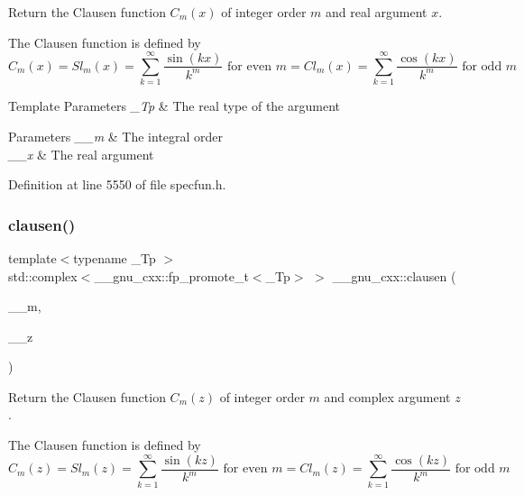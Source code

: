 Return the Clausen function $ C_m(x) $ of integer order $ m $ and real argument $ x $.

The Clausen function is defined by \[ C_m(x) = Sl_m(x) = \sum_{k=1}^\infty\frac{\sin(kx)}{k^m} \mbox{ for even } m = Cl_m(x) = \sum_{k=1}^\infty\frac{\cos(kx)}{k^m} \mbox{ for odd } m \]


\begin{DoxyTemplParams}{Template Parameters}
{\em \+\_\+\+Tp} & The real type of the argument \\
\hline
\end{DoxyTemplParams}

\begin{DoxyParams}{Parameters}
{\em \+\_\+\+\_\+m} & The integral order \\
\hline
{\em \+\_\+\+\_\+x} & The real argument \\
\hline
\end{DoxyParams}


Definition at line 5550 of file specfun.\+h.

\mbox{\label{group__gnu__math__spec__func_gaf7c4317ef6bfd3a4bf0ddcba22ee7588}} 
\subsubsection{\texorpdfstring{clausen()}{clausen()}\hspace{0.1cm}{\footnotesize\ttfamily [2/2]}}
{\footnotesize\ttfamily template$<$typename \+\_\+\+Tp $>$ \\
std\+::complex$<$\+\_\+\+\_\+gnu\+\_\+cxx\+::fp\+\_\+promote\+\_\+t$<$\+\_\+\+Tp$>$ $>$ \+\_\+\+\_\+gnu\+\_\+cxx\+::clausen (\begin{DoxyParamCaption}\item[{unsigned int}]{\+\_\+\+\_\+m,  }\item[{std\+::complex$<$ \+\_\+\+Tp $>$}]{\+\_\+\+\_\+z }\end{DoxyParamCaption})\hspace{0.3cm}{\ttfamily [inline]}}

Return the Clausen function $ C_m(z) $ of integer order $ m $ and complex argument $ z $.

The Clausen function is defined by \[ C_m(z) = Sl_m(z) = \sum_{k=1}^\infty\frac{\sin(kz)}{k^m} \mbox{ for even } m = Cl_m(z) = \sum_{k=1}^\infty\frac{\cos(kz)}{k^m} \mbox{ for odd } m \]


